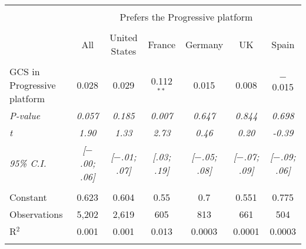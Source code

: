 
\begin{tabular}{@{\extracolsep{5pt}}lcccccc} 
\\[-1.8ex]\hline 
\hline \\[-1.8ex] 
 & \multicolumn{6}{c}{Prefers the Progressive platform} \\ 
\cline{2-7} 
\\[-1.8ex] & All & United States & France & Germany & UK & Spain \\ 
\hline \\[-1.8ex] 
 GCS in Progressive platform & 0.028 & 0.029 & 0.112$^{**}$ & 0.015 & 0.008 & $-$0.015 \\ 
 \textit{P-value} & \textit{0.057} & \textit{0.185} & \textit{0.007} & \textit{0.647} & \textit{0.844} & \textit{0.698} \\
 \textit{t} & \textit{1.90} & \textit{1.33} & \textit{2.73} & \textit{0.46} & \textit{0.20} & \textit{-0.39} \\
 \textit{95\% C.I.} & \textit{[$-$.00; .06]} & \textit{[$-$.01; .07]} & \textit{[.03; .19]} & \textit{[$-$.05; .08]} & \textit{[$-$.07; .09]} & \textit{[$-$.09; .06]} \\ 
 \hline \\[-1.8ex] 
Constant & 0.623 & 0.604 & 0.55 & 0.7 & 0.551 & 0.775 \\ 
Observations & 5,202 & 2,619 & 605 & 813 & 661 & 504 \\ 
R$^{2}$ & 0.001 & 0.001 & 0.013 & 0.0003 & 0.0001 & 0.0003 \\ 
\hline 
\hline \\[-1.8ex] 
\end{tabular} 
